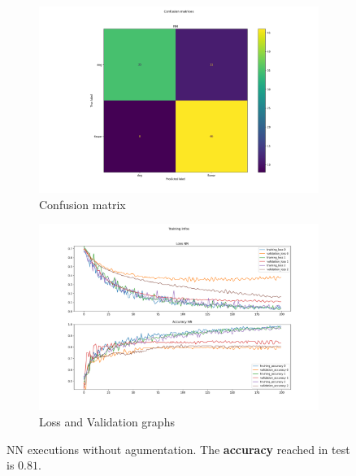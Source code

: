 \documentclass{report}
\begin{document}
\begin{figure}[t!]
  \centering
  \hspace{-2cm}
  \begin{subfigure}[t]{0.49\textwidth}
    \centering
    \includegraphics[width=1.3\textwidth]{2.senza_augmentationNN/conf_mat.png}
    \caption{Confusion matrix}
    \label{fig:image-set4-sub1}
  \end{subfigure}
  \hspace{-0.5cm}
  \begin{subfigure}[t]{0.49\textwidth}
    \centering
    \includegraphics[width=1.3\textwidth]{2.senza_augmentationNN/training_infos.png}
    \caption{Loss and Validation graphs}
    \label{fig:image-set4-sub2}
  \end{subfigure}

  \caption{NN executions without agumentation. The \textbf{accuracy} reached in test is $0.81$.}
  \label{fig:image-set4}
\end{figure}
\end{document}
